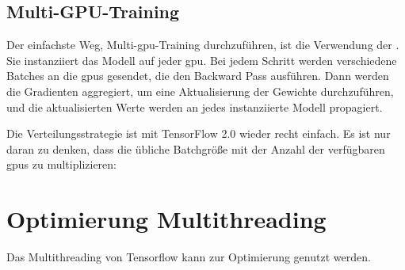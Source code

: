 \medskip

\subsection{Multi-GPU-Training}


Der einfachste Weg, Multi-\ac{gpu}-Training durchzuführen, ist die Verwendung der . Sie instanziiert das Modell auf jeder \ac{gpu}. Bei jedem Schritt werden verschiedene Batches an die \ac{gpu}s gesendet, die den Backward Pass  ausführen. Dann werden die Gradienten aggregiert, um eine Aktualisierung der Gewichte durchzuführen, und die aktualisierten Werte werden  an jedes instanziierte Modell propagiert.

Die Verteilungsstrategie ist mit TensorFlow 2.0 wieder recht einfach. Es ist nur daran zu denken, dass die übliche Batchgröße mit der Anzahl der verfügbaren \ac{gpu}s zu multiplizieren:

\medskip
{}









\section{Optimierung Multithreading}


Das Multithreading von Tensorflow kann zur Optimierung genutzt werden.


